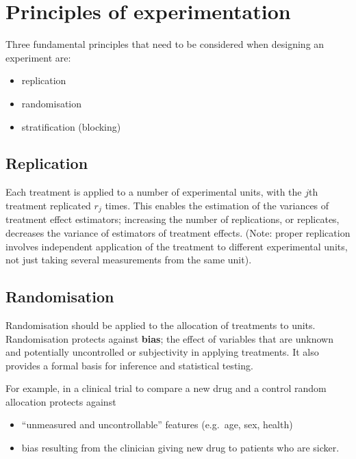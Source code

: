 \documentclass[
]{book}
\providecommand{\tightlist}{%
  \setlength{\itemsep}{0pt}\setlength{\parskip}{0pt}}
\theoremstyle{definition}
\theoremstyle{definition}
\theoremstyle{definition}
\theoremstyle{definition}
\theoremstyle{remark}
\begin{document}
\hypertarget{principles}{%
\section{Principles of experimentation}\label{principles}}

Three fundamental principles that need to be considered when designing an experiment are:

\begin{itemize}
\tightlist
\item
  replication
\item
  randomisation
\item
  stratification (blocking)
\end{itemize}

\hypertarget{replication}{%
\subsection{Replication}\label{replication}}

Each treatment is applied to a number of experimental units, with the \(j\)th treatment replicated \(r_{j}\) times. This enables the estimation of the variances of treatment effect estimators; increasing the number of replications, or replicates, decreases the variance of estimators of treatment effects.
(Note: proper replication involves independent application of the treatment to different experimental units, not just taking several measurements from the same unit).

\hypertarget{randomisation}{%
\subsection{Randomisation}\label{randomisation}}

Randomisation should be applied to the allocation of treatments to units. Randomisation protects against \textbf{bias}; the effect of
variables that are unknown and potentially uncontrolled or
subjectivity in applying treatments. It also provides a formal basis
for inference and statistical testing.

For example, in a clinical trial to compare a new drug and a control random allocation protects against

\begin{itemize}
\tightlist
\item
  ``unmeasured and uncontrollable'' features (e.g.~age, sex, health)
\item
  bias resulting from the clinician giving new drug to patients who are sicker.
\end{itemize}
\end{document}
